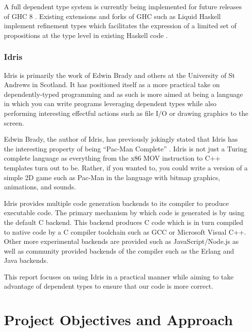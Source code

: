 \documentclass[a4paper, notitlepage]{report}
\begin{document}
A full dependent type system is currently being implemented for future releases
of GHC 8 \cite{eisenberg_dependent_2016,weirich_specif_2017}. Existing extensions
and forks of GHC such as Liquid Haskell implement refinement types which
facilitates the expression of a limited set of propositions at the type level in
existing Haskell code \cite{vazou_refinement_2014}.

\subsection{Idris}
\label{sec:org51b755f}
Idris is primarily the work of Edwin Brady and others at the University of St
Andrews in Scotland. It has positioned itself as a more practical take on
dependently-typed programming and as such is more aimed at being a language in
which you can write programs leveraging dependent types while also performing
interesting effectful actions such as file I/O or drawing graphics to the
screen.

Edwin Brady, the author of Idris, has previously jokingly stated that Idris has
the interesting property of being ``Pac-Man Complete'' \cite{scala_world_2015}.
Idris is not just a Turing complete language as everything from the x86 MOV
instruction \cite{dolan_mov_2013} to C++ templates \cite{veldhuizen_templates_2003}
turn out to be. Rather, if you wanted to, you could write a version of a simple
2D game such as Pac-Man in the language with bitmap graphics, animations, and
sounds.

Idris provides multiple code generation backends to its compiler to produce
executable code. The primary mechanism by which code is generated is by using
the default C backend. This backend produces C code which is in turn compiled to
native code by a C compiler toolchain such as GCC or Microsoft Visual C++. Other
more experimental backends are provided such as JavaScript/Node.js as well as
community provided backends of the compiler such as the Erlang
\cite{elliott_erlang_2015} and Java \cite{idris_java} backends.

This report focuses on using Idris in a practical manner while aiming to take
advantage of dependent types to ensure that our code is more correct.
\chapter{Project Objectives and Approach}
\label{sec:org73975ee}
\end{document}

